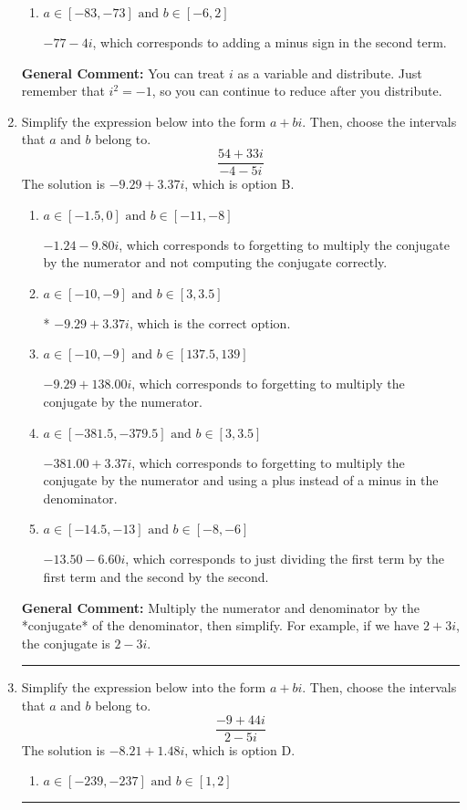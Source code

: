\documentclass{extbook}[14pt]
\newcommand{\litem}[1]{\item #1

\rule{\textwidth}{0.4pt}}
\begin{document}
\begin{enumerate}
{\begin{enumerate}[label=\Alph*.]
 $-77 + 4 i$, which corresponds to adding a minus sign in the first term.
\item \( a \in [-83, -73] \text{ and } b \in [-6, 2] \)

 $-77 - 4 i$, which corresponds to adding a minus sign in the second term.
\end{enumerate}

\textbf{General Comment:} You can treat $i$ as a variable and distribute. Just remember that $i^2=-1$, so you can continue to reduce after you distribute.
}
\litem{
Simplify the expression below into the form $a+bi$. Then, choose the intervals that $a$ and $b$ belong to.
\[ \frac{54 + 33 i}{-4 - 5 i} \]The solution is \( -9.29  + 3.37 i \), which is option B.\begin{enumerate}[label=\Alph*.]
\item \( a \in [-1.5, 0] \text{ and } b \in [-11, -8] \)

 $-1.24  - 9.80 i$, which corresponds to forgetting to multiply the conjugate by the numerator and not computing the conjugate correctly.
\item \( a \in [-10, -9] \text{ and } b \in [3, 3.5] \)

* $-9.29  + 3.37 i$, which is the correct option.
\item \( a \in [-10, -9] \text{ and } b \in [137.5, 139] \)

 $-9.29  + 138.00 i$, which corresponds to forgetting to multiply the conjugate by the numerator.
\item \( a \in [-381.5, -379.5] \text{ and } b \in [3, 3.5] \)

 $-381.00  + 3.37 i$, which corresponds to forgetting to multiply the conjugate by the numerator and using a plus instead of a minus in the denominator.
\item \( a \in [-14.5, -13] \text{ and } b \in [-8, -6] \)

 $-13.50  - 6.60 i$, which corresponds to just dividing the first term by the first term and the second by the second.
\end{enumerate}

\textbf{General Comment:} Multiply the numerator and denominator by the *conjugate* of the denominator, then simplify. For example, if we have $2+3i$, the conjugate is $2-3i$.
}
\litem{
Simplify the expression below into the form $a+bi$. Then, choose the intervals that $a$ and $b$ belong to.
\[ \frac{-9 + 44 i}{2 - 5 i} \]The solution is \( -8.21  + 1.48 i \), which is option D.\begin{enumerate}[label=\Alph*.]
\item \( a \in [-239, -237] \text{ and } b \in [1, 2] \)


\end{enumerate}}
\end{enumerate}
\end{document}
